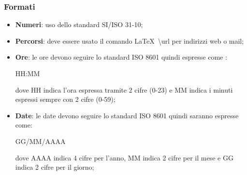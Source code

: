 \documentclass[../NormeDiProgetto.tex]{subfiles}
\begin{document}
		\subsubsection{Formati}
		\begin{itemize}
			\item \textbf{Numeri}: uso dello standard SI/ISO 31-10; 
			\item \textbf{Percorsi}: deve essere usato il comando \LaTeX\ \textbackslash url per indirizzi web  o mail;
			\item \textbf{Ore}: le ore devono seguire lo standard ISO 8601 quindi espresse come :\\
			\begin{center}
				HH:MM 
			\end{center}  
			dove HH indica l'ora espressa tramite 2 cifre (0-23) e MM indica i minuti espressi sempre con 2 cifre (0-59);
			\item \textbf{Date}: le date devono seguire lo standard ISO 8601 quindi saranno espresse come:
			\begin{center}
				GG/MM/AAAA
			\end{center}  
			dove AAAA indica 4 cifre per l'anno, MM indica 2 cifre per il mese e GG indica 2 cifre per il giorno;
		\end{itemize}
\end{document}
